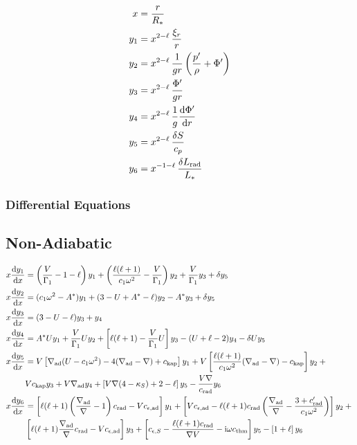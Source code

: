 \documentclass[fleqn]{article}
\newcommand{\diff}{\ensuremath{\mathrm{d}}}
\newcommand{\ii}{\ensuremath{\mathrm{i}}}
\newcommand{\Vg}{\ensuremath{\frac{V}{\Gamma_{1}}}}
\newcommand{\As}{\ensuremath{A^{\ast}}}
\newcommand{\nabad}{\ensuremath{\nabla_{\rm ad}}}
\newcommand{\kapS}{\ensuremath{\kappa_{S}}}
\newcommand{\crad}{\ensuremath{c_{\rm rad}}}
\newcommand{\cepsad}{\ensuremath{c_{\epsilon,{\rm ad}}}}
\newcommand{\cepsS}{\ensuremath{c_{\epsilon,S}}}
\newcommand{\cthm}{\ensuremath{c_{\rm thm}}}
\newcommand{\ckap}{\ensuremath{c_{\rm kap}}}
\newcommand{\Rstar}{\ensuremath{R_{\ast}}}
\newcommand{\Lrad}{\ensuremath{L_{\rm rad}}}
\newcommand{\Lstar}{\ensuremath{L_{\ast}}}
\begin{document}
\begin{align*}
x     &= \frac{r}{\Rstar} \\
y_{1} &= x^{2-\ell}\, \frac{\xi_{r}}{r} \\
y_{2} &= x^{2-\ell}\, \frac{1}{gr} \left( \frac{p'}{\rho} + \Phi' \right)\\
y_{3} &= x^{2-\ell}\, \frac{\Phi'}{gr}\\
y_{4} &= x^{2-\ell}\, \frac{1}{g} \frac{\diff \Phi'}{\diff r}\\
y_{5} &= x^{2-\ell}\, \frac{\delta S}{c_{p}}\\
y_{6} &= x^{-1-\ell}\, \frac{\delta \Lrad}{\Lstar}
\end{align*}

\subsubsection*{Differential Equations}

\subsection*{Non-Adiabatic}

\begin{align*}
x \frac{\diff y_{1}}{\diff x} &=
\left(\Vg - 1 - \ell \right) y_{1} +
\left(\frac{\ell(\ell+1)}{c_{1} \omega^{2}} - \Vg \right) y_{2} +
\Vg y_{3} +
\delta y_{5} \\
x \frac{\diff y_{2}}{\diff x} &=
(c_{1} \omega^{2} - \As ) y_{1} +
(3 - U + \As - \ell) y_{2} -
\As y_{3} +
\delta y_{5} \\
x \frac{\diff y_{3}}{\diff x} &=
(3 - U - \ell) y_{3} +
y_{4} \\
x \frac{\diff y_{4}}{\diff x} &=
\As U y_{1} +
\Vg U y_{2} +
\left[ \ell(\ell+1) - \Vg U \right] y_{3} -
(U + \ell - 2) y_{4}
- \delta U y_{5} \\
x \frac{\diff y_{5}}{\diff x} &=
V \left[ \nabad (U - c_{1}\omega^{2}) - 4 (\nabad - \nabla) + \ckap \right] y_{1} + 
V \left[ \frac{\ell(\ell+1)}{c_{1} \omega^{2}} (\nabad - \nabla) - \ckap \right] y_{2} + \mbox{} \\
& 
V \ckap y_{3} + 
V \nabad y_{4} + 
\left[ V \nabla (4 - \kapS) + 2 - \ell \right] y_{5} -
\frac{V \nabla}{\crad} y_{6} \\
x \frac{\diff y_{6}}{\diff x} &=
\left[ \ell(\ell+1)\left( \frac{\nabad}{\nabla} - 1 \right) \crad - V \cepsad \right] y_{1} +
\left[ V \cepsad - \ell(\ell+1)\crad \left( \frac{\nabad}{\nabla} - \frac{3 + \crad'}{c_{1}\omega^{2}} \right) \right] y_{2} + \mbox{} \\
&
\left[ \ell(\ell+1) \frac{\nabad}{\nabla} \crad - V \cepsad \right] y_{3} +
\left[ \cepsS - \frac{\ell(\ell+1)\crad}{\nabla V} - \ii \omega \cthm\right] y_{5} -
\left[ 1 + \ell \right] y_{6}
\end{align*}
\end{document}
